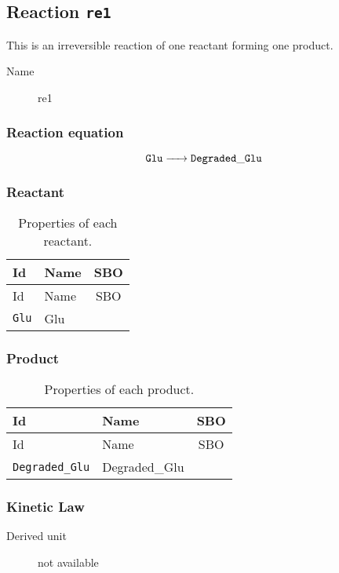 \documentclass[11pt,twoside,bibtotoc,a4paper]{scrartcl}
\newcommand{\reaction}[1]{\begin{equation}\ce{#1}\end{equation}}
\begin{document}
\subsection{Reaction \texttt{re1}}
This is an irreversible reaction of one reactant forming one product.\begin{description}
\item[Name] re1
\end{description}

\subsubsection*{Reaction equation}
\reaction{ $\mathtt{Glu}$ ->  $\mathtt{Degraded\-\_Glu}$}

\subsubsection*{Reactant}
\begin{longtable}[h!]{llc}
\caption{Properties of each reactant.}\\
\toprule
Id & Name & SBO\\
\midrule
\endfirsthead
\toprule
Id & Name & SBO\\
\midrule
\endhead
\texttt{Glu}&Glu&\\
\bottomrule\end{longtable}

\subsubsection*{Product}
\begin{longtable}[h!]{llc}
\caption{Properties of each product.}\\
\toprule
Id & Name & SBO\\
\midrule
\endfirsthead
\toprule
Id & Name & SBO\\
\midrule
\endhead
\texttt{Degraded\-\_Glu}&Degraded\-\_Glu&\\
\bottomrule\end{longtable}

\subsubsection*{Kinetic Law}
\begin{description}
\item[Derived unit] not available
\end{description}
\end{document}
